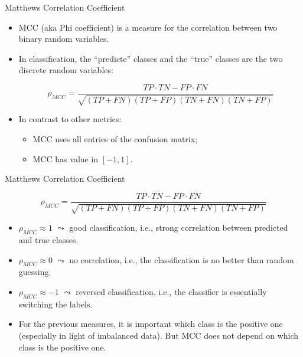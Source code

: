 \documentclass[11pt,compress,t,notes=noshow, xcolor=table]{beamer}
\begin{document}
\begin{vbframe}{Matthews Correlation Coefficient}
	\footnotesize{
	\begin{itemize}
		\item MCC (aka Phi coefficient) is a measure for the correlation between two binary random variables. 
        \vspace{20pt}
  
        \item In classification, the ``predicte'' classes and the ``true'' classes are the two discrete random variables:
	
		$$   \rho_{MCC} = \frac{TP\cdot TN - FP \cdot FN}{\sqrt{(TP+FN)(TP+FP)(TN+FN)(TN+FP)}}$$
        \vspace{20pt}

        \item In contrast to other metrics: 
        \begin{itemize}
            \footnotesize
            \item MCC uses all entries of the confusion matrix;
            \item MCC has value in $[-1,1]$.
        \end{itemize}
		
    \end{itemize}
	
	}
\end{vbframe}

\begin{vbframe}{Matthews Correlation Coefficient}
    \footnotesize{
        $$   \rho_{MCC} = \frac{TP\cdot TN - FP \cdot FN}{\sqrt{(TP+FN)(TP+FP)(TN+FN)(TN+FP)}}$$

        \begin{itemize}
            \item $\rho_{MCC} \approx 1$ $\leadsto$ good classification, i.e., strong correlation between predicted and true classes.
            \vspace{10pt}
    	
            \item $\rho_{MCC} \approx 0$ $\leadsto$ no correlation, i.e., the classification is no better than random guessing.
            \vspace{10pt}
    	
            \item $\rho_{MCC} \approx -1$ $\leadsto$ reversed classification, i.e., the classifier is essentially switching the labels.
            \vspace{10pt}
    
            \item For the previous measures, it is important which class is the positive one (especially in light of imbalanced data). But MCC does not depend on which class is the positive one.
            
        \end{itemize}
         
    }
    
\end{vbframe}
\end{document}
